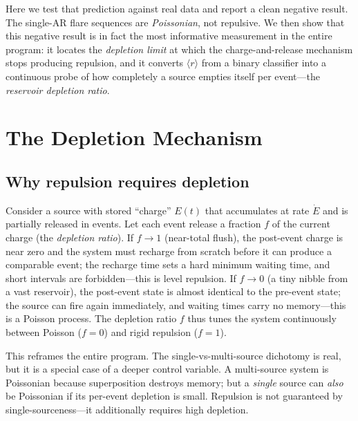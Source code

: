 \documentclass[12pt,a4paper]{article}
\begin{document}
Here we test that prediction against real data and report a clean negative result. The single-AR flare sequences are \emph{Poissonian}, not repulsive. We then show that this negative result is in fact the most informative measurement in the entire program: it locates the \emph{depletion limit} at which the charge-and-release mechanism stops producing repulsion, and it converts $\langle r\rangle$ from a binary classifier into a continuous probe of how completely a source empties itself per event---the \emph{reservoir depletion ratio}.

\section{The Depletion Mechanism}

\subsection{Why repulsion requires depletion}

Consider a source with stored ``charge'' $E(t)$ that accumulates at rate $\dot E$ and is partially released in events. Let each event release a fraction $f$ of the current charge (the \emph{depletion ratio}). If $f\to1$ (near-total flush), the post-event charge is near zero and the system must recharge from scratch before it can produce a comparable event; the recharge time sets a hard minimum waiting time, and short intervals are forbidden---this is level repulsion. If $f\to0$ (a tiny nibble from a vast reservoir), the post-event state is almost identical to the pre-event state; the source can fire again immediately, and waiting times carry no memory---this is a Poisson process. The depletion ratio $f$ thus tunes the system continuously between Poisson ($f=0$) and rigid repulsion ($f=1$).

This reframes the entire program. The single-vs-multi-source dichotomy is real, but it is a special case of a deeper control variable. A multi-source system is Poissonian because superposition destroys memory; but a \emph{single} source can \emph{also} be Poissonian if its per-event depletion is small. Repulsion is not guaranteed by single-sourceness---it additionally requires high depletion.
\end{document}

